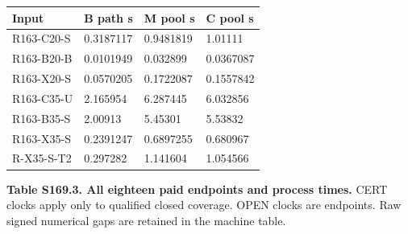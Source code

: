 \documentclass[
  american,
  11pt,
]{article}
\newcounter{none} %
\begin{document}
{\def\LTcaptype{none} %
\begin{longtable}[]{@{}llll@{}}
\toprule\noalign{}
Input & B path s & M pool s & C pool s \\
\midrule\noalign{}
\endhead
\bottomrule\noalign{}
\endlastfoot
R163-C20-S & 0.3187117 & 0.9481819 & 1.01111 \\
R163-B20-B & 0.0101949 & 0.032899 & 0.0367087 \\
R163-X20-S & 0.0570205 & 0.1722087 & 0.1557842 \\
R163-C35-U & 2.165954 & 6.287445 & 6.032856 \\
R163-B35-S & 2.00913 & 5.45301 & 5.53832 \\
R163-X35-S & 0.2391247 & 0.6897255 & 0.680967 \\
R-X35-S-T2 & 0.297282 & 1.141604 & 1.054566 \\
\end{longtable}
}


\textbf{Table S169.3. All eighteen paid endpoints and process times.}
CERT clocks apply only to qualified closed coverage. OPEN clocks are
endpoints. Raw signed numerical gaps are retained in the machine table.
\end{document}
